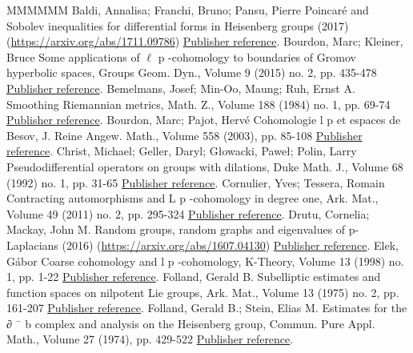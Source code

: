 \begin{thebibliography}{MMMMMM}
 Baldi, Annalisa; Franchi, Bruno; Pansu, Pierre Poincaré and Sobolev inequalities for differential forms in Heisenberg groups (2017) (\url{https://arxiv.org/abs/1711.09786}) \href{https://ahl.centre-mersenne.org/item/AHL_2018__1__267_0/#BFP}{Publisher reference}.
 Bourdon, Marc; Kleiner, Bruce Some applications of \(\ell\) p -cohomology to boundaries of Gromov hyperbolic spaces, Groups Geom. Dyn., Volume 9 (2015) no. 2, pp. 435-478 \href{https://ahl.centre-mersenne.org/item/AHL_2018__1__267_0/#Bourdon-Kleiner}{Publisher reference}.
 Bemelmans, Josef; Min-Oo, Maung; Ruh, Ernst A. Smoothing Riemannian metrics, Math. Z., Volume 188 (1984) no. 1, pp. 69-74 \href{https://ahl.centre-mersenne.org/item/AHL_2018__1__267_0/#B-MinOo-Ruh}{Publisher reference}.
 Bourdon, Marc; Pajot, Hervé Cohomologie l p  et espaces de Besov, J. Reine Angew. Math., Volume 558 (2003), pp. 85-108 \href{https://ahl.centre-mersenne.org/item/AHL_2018__1__267_0/#Bourdon-Pajot}{Publisher reference}.
 Christ, Michael; Geller, Daryl; Głowacki, Paweł; Polin, Larry Pseudodifferential operators on groups with dilations, Duke Math. J., Volume 68 (1992) no. 1, pp. 31-65 \href{https://ahl.centre-mersenne.org/item/AHL_2018__1__267_0/#CGGP}{Publisher reference}.
 Cornulier, Yves; Tessera, Romain Contracting automorphisms and L p -cohomology in degree one, Ark. Mat., Volume 49 (2011) no. 2, pp. 295-324 \href{https://ahl.centre-mersenne.org/item/AHL_2018__1__267_0/#Cornulier-Tessera}{Publisher reference}.
 Drutu, Cornelia; Mackay, John M. Random groups, random graphs and eigenvalues of p-Laplacians (2016) (\url{https://arxiv.org/abs/1607.04130}) \href{https://ahl.centre-mersenne.org/item/AHL_2018__1__267_0/#Drutu-Mackay}{Publisher reference}.
 Elek, Gábor Coarse cohomology and l p -cohomology, K-Theory, Volume 13 (1998) no. 1, pp. 1-22 \href{https://ahl.centre-mersenne.org/item/AHL_2018__1__267_0/#Elek}{Publisher reference}.
 Folland, Gerald B. Subelliptic estimates and function spaces on nilpotent Lie groups, Ark. Mat., Volume 13 (1975) no. 2, pp. 161-207 \href{https://ahl.centre-mersenne.org/item/AHL_2018__1__267_0/#Folland_1975}{Publisher reference}.
 Folland, Gerald B.; Stein, Elias M. Estimates for the ∂ ¯ b  complex and analysis on the Heisenberg group, Commun. Pure Appl. Math., Volume 27 (1974), pp. 429-522 \href{https://ahl.centre-mersenne.org/item/AHL_2018__1__267_0/#FollandStein}{Publisher reference}.

\end{thebibliography}
